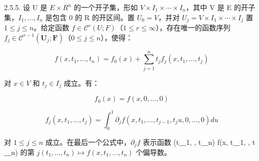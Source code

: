 2.5.5. 设 U 是 \(E \times R^{n}\) 的一个开子集，形如 \(V \times I_{1} \times \cdots \times I_{n}\)，其中 V 是 E 的开子集，\(I_{1}, \ldots, I_{n}\) 是包含 0 的 R 的开区间。置 \(U_{0} = V\)，并对 \(U_{j} = V \times I_{1} \times \cdots \times I_{j}\) 置 \(1 \leqslant j \leqslant n\)。给定函数 \(f \in \mathcal{C}^{r}(U; F)\)（\(1 \leqslant r \leqslant \infty\)），存在唯一的函数序列 \(f_{j}\in\mathcal{C}^{r-1}(\mathbf{U}_{j};\mathbf{F})\)（\(0\leqslant j\leqslant n\)），使得：

\[
f (x, t _ {1}, \dots , t _ {n}) = f _ {0} (x) + \sum_ {j = 1} ^ {n} t _ {j} f _ {j} (x, t _ {1}, \dots , t _ {j})
\]

对 \(x \in V\) 和 \(t_j \in I_j\) 成立。有：

\[
f _ {0} (x) = f (x, 0, \dots , 0)
\]

\[
f _ {j} (x, t _ {1}, \dots , t _ {j}) = \int_ {0} ^ {1} \partial_ {j} f (x, t _ {1}, \dots , t _ {j - 1}, t _ {j} u, 0, \dots , 0) d u
\]

对 \(1 \leqslant j \leqslant n\) 成立。在最后一个公式中，\(\partial_j f\) 表示函数 (t＿1, , t＿n)  f(x, t＿1, , t＿n) 的第 \(j\)\((t_1, \ldots, t_n) \mapsto f(x, t_1, \ldots, t_n)\) 个偏导数。

